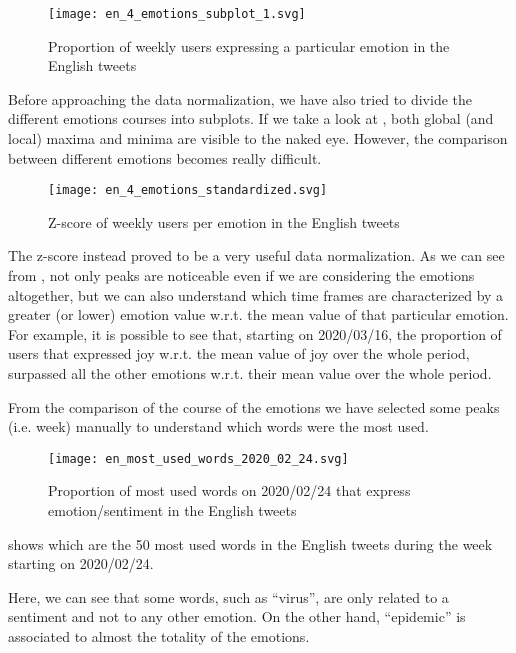 \begin{figure}[H]
	\centering
    	\texttt{[image: en\_4\_emotions\_subplot\_1.svg]}
    	\caption{Proportion of weekly users expressing a particular emotion in the English tweets}
    	\label{fig:en-4-emotions-subplot-1}
\end{figure}

Before approaching the data normalization, we have also tried to divide the different emotions courses into subplots. If we take a look at , both global (and local) maxima and minima are visible to the naked eye. However, the comparison between different emotions becomes really difficult.

\begin{figure}[H]
	\centering
    	\texttt{[image: en\_4\_emotions\_standardized.svg]}
    	\caption{Z-score of weekly users per emotion in the English tweets}
    	\label{fig:en-4-emotions-std}
\end{figure}

The z-score instead proved to be a very useful data normalization. As we can see from , not only peaks are noticeable even if we are considering the emotions altogether, but we can also understand which time frames are characterized by a greater (or lower) emotion value w.r.t. the mean value of that particular emotion. For example, it is possible to see that, starting on 2020/03/16, the proportion of users that expressed joy w.r.t. the mean value of joy over the whole period, surpassed all the other emotions w.r.t. their mean value over the whole period.

From the comparison of the course of the emotions we have selected some peaks (i.e. week) manually to understand which words were the most used. 

\begin{figure}[H]
	\centering
    	\texttt{[image: en\_most\_used\_words\_2020\_02\_24.svg]}
    	\caption{Proportion of most used words on 2020/02/24 that express emotion/sentiment in the English tweets}
    	\label{fig:en-most-used-word-2020-02-24}
\end{figure}

 shows which are the 50 most used words in the English tweets during the week starting on 2020/02/24.

Here, we can see that some words, such as “virus”, are only related to a sentiment and not to any other emotion. On the other hand, “epidemic” is associated to almost the totality of the emotions.

